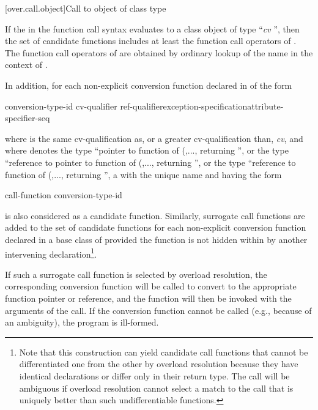 [over.call.object]{Call to object of class type}

\pnum
If the
in the function call syntax evaluates
to a class object of type ``\textit{cv}
'',
then the set of candidate
functions includes at least the function call operators of
.
The
function call operators of
are obtained by ordinary lookup of
the name
in the context of
.

\pnum
In addition, for each non-explicit conversion function declared in  of the
form

\begin{ncsimplebnf}
 conversion-type-id \terminal{(\,)} cv-qualifier ref-qualifier\opt exception-specification\opt attribute-specifier-seq\opt{} \terminal{;}
\end{ncsimplebnf}

where
is the same cv-qualification as, or a greater cv-qualification than,
\textit{cv},
and where
denotes the type ``pointer to function
of (,..., returning '',
or the type ``reference to pointer to function
of (,..., returning '',
or the type
``reference to function of (,...,
returning '', a  with the unique name
and having the form

\begin{ncbnf}
 call-function \terminal{(} conversion-type-id  
\end{ncbnf}

is also considered as a candidate function.
Similarly, surrogate
call functions are added to the set of candidate functions for
each non-explicit conversion function declared in a base class of
provided the function is not hidden within
by another
intervening declaration\footnote{Note that this construction can yield
candidate call functions that cannot be
differentiated one from the other by overload resolution because they have
identical
declarations or differ only in their return type.
The call will be ambiguous
if overload
resolution cannot select a match to the call that is uniquely better than such
undifferentiable functions.}.

\pnum
If such a surrogate call function is selected by overload
resolution, the corresponding conversion function will be called to convert
to the appropriate function pointer or reference, and the function
will then be invoked with the arguments of the call. If the
conversion function cannot be called (e.g., because of an ambiguity),
the program is ill-formed.

